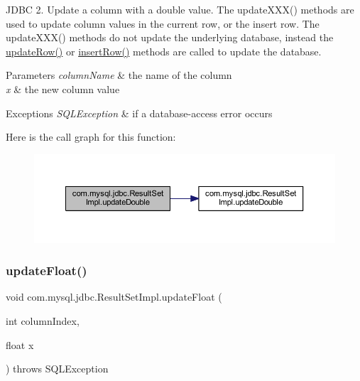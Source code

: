 J\+D\+BC 2. Update a column with a double value. The update\+X\+X\+X() methods are used to update column values in the current row, or the insert row. The update\+X\+X\+X() methods do not update the underlying database, instead the \mbox{\hyperlink{classcom_1_1mysql_1_1jdbc_1_1_result_set_impl_a2842d32292d023aaeeafedeed3322981}{update\+Row()}} or \mbox{\hyperlink{classcom_1_1mysql_1_1jdbc_1_1_result_set_impl_a78e304e3279cbcf60392f18c1385e3bf}{insert\+Row()}} methods are called to update the database.


\begin{DoxyParams}{Parameters}
{\em column\+Name} & the name of the column \\
\hline
{\em x} & the new column value\\
\hline
\end{DoxyParams}

\begin{DoxyExceptions}{Exceptions}
{\em S\+Q\+L\+Exception} & if a database-\/access error occurs \\
\hline
\end{DoxyExceptions}
Here is the call graph for this function\+:
\nopagebreak
\begin{figure}[H]
\begin{center}
\leavevmode
\includegraphics[width=350pt]{classcom_1_1mysql_1_1jdbc_1_1_result_set_impl_aadcc20dabbb79344eed654cbdccf42d2_cgraph}
\end{center}
\end{figure}
\mbox{\label{classcom_1_1mysql_1_1jdbc_1_1_result_set_impl_a4f0a2514b5e2218b899cf71697f57b0f}} 
\subsubsection{\texorpdfstring{update\+Float()}{updateFloat()}\hspace{0.1cm}{\footnotesize\ttfamily [1/2]}}
{\footnotesize\ttfamily void com.\+mysql.\+jdbc.\+Result\+Set\+Impl.\+update\+Float (\begin{DoxyParamCaption}\item[{int}]{column\+Index,  }\item[{float}]{x }\end{DoxyParamCaption}) throws S\+Q\+L\+Exception}

